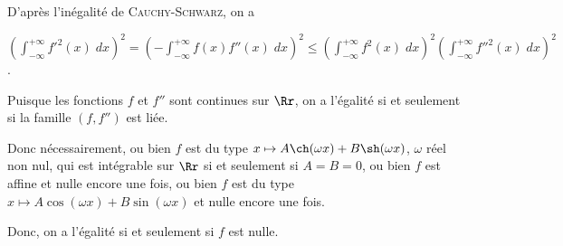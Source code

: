 {{D'après l'inégalité de \textsc{Cauchy}-\textsc{Schwarz}, on a

\begin{center}
$\left(\int_{-\infty}^{+\infty}f'^2(x)\;dx\right)^2=\left(-\int_{-\infty}^{+\infty}f(x)f''(x)\;dx\right)^2\leqslant\left(\int_{-\infty}^{+\infty}f^2(x)\;dx\right)^2\left(\int_{-\infty}^{+\infty}f''^2(x)\;dx\right)^2$.
\end{center}

Puisque les fonctions $f$ et $f''$ sont continues sur $\Rr$, on a l'égalité si et seulement si la famille $(f,f'')$ est liée.

Donc nécessairement, ou bien $f$ est du type $x\mapsto A\ch(\omega x)+ B\sh(\omega x)$, $\omega$ réel non nul, qui est intégrable sur $\Rr$ si et seulement si $A = B = 0$, ou bien $f$ est affine et nulle encore une fois, ou bien $f$ est du type $x\mapsto A\cos(\omega x)+ B\sin(\omega x)$ et nulle encore une fois.

Donc, on a l'égalité si et seulement si $f$ est nulle.
}
}

